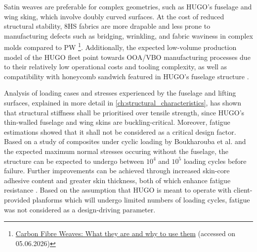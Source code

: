 Satin weaves are preferable for complex geometries, such as HUGO's fuselage and wing sking, which involve doubly curved surfaces. At the cost of reduced structural stability, 8HS fabrics are more drapable and less prone to manufacturing defects such as bridging, wrinkling, and fabric waviness in complex molds compared to PW \footnote{\href{https://www.elevatedmaterials.com/carbon-fiber-weaves-what-they-are-and-why-to-use-them/}{Carbon Fibre Weaves: What they are and why to use them} (accessed on 05.06.2026)}. Additionally, the expected low-volume production model of the HUGO fleet point towards OOA/VBO manufacturing processes due to their relatively low operational costs and tooling complexity, as well as compatibility with honeycomb sandwich featured in HUGO's fuselage structure \cite{CENTEA2015132}.



Analysis of loading cases and stresses experienced by the fuselage and lifting surfaces, explained in more detail in \autoref{ch:structural_characteristics}, has shown that structural stiffness shall be prioritised over tensile strength, since HUGO’s thin-walled fuselage and wing skins are buckling-critical. Moreover, fatigue estimations showed that it shall not be considered as a critical design factor. Based on a study of composites under cyclic loading by Boukharouba et al. \cite{Boukharouba2014} and the expected maximum normal stresses occuring without the fuselage, the structure can be expected to undergo between $10^4$ and $10^5$ loading cycles before failure. Further improvements can be achieved through increased skin-core adhesive content and greater skin thickness, both of which enhance fatigue resistance \cite{Jen2009Adhesive, Jen2009SheetThickness}. Based on the assumption that HUGO is meant to operate with client-provided planforms which will undergo limited numbers of loading cycles, fatigue was not considered as a design-driving parameter.


